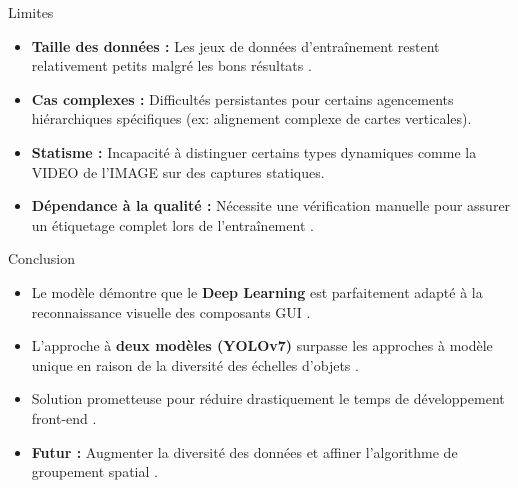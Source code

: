 \documentclass{beamer}
\begin{document}
\begin{frame}{Limites}
    \begin{itemize}
        \item \textbf{Taille des données :} Les jeux de données d'entraînement restent relativement petits malgré les bons résultats .
        \item \textbf{Cas complexes :} Difficultés persistantes pour certains agencements hiérarchiques spécifiques (ex: alignement complexe de cartes verticales).
        \item \textbf{Statisme :} Incapacité à distinguer certains types dynamiques comme la VIDEO de l'IMAGE sur des captures statiques.
        \item \textbf{Dépendance à la qualité :} Nécessite une vérification manuelle pour assurer un étiquetage complet lors de l'entraînement .
    \end{itemize}
\end{frame}

\begin{frame}{Conclusion}
    \begin{itemize}
        \item Le modèle démontre que le \textbf{Deep Learning} est parfaitement adapté à la reconnaissance visuelle des composants GUI .
        \item L'approche à \textbf{deux modèles (YOLOv7)} surpasse les approches à modèle unique en raison de la diversité des échelles d'objets .
        \item Solution prometteuse pour réduire drastiquement le temps de développement front-end .
        \item \textbf{Futur :} Augmenter la diversité des données et affiner l'algorithme de groupement spatial .
    \end{itemize}
\end{frame}
\end{document}
